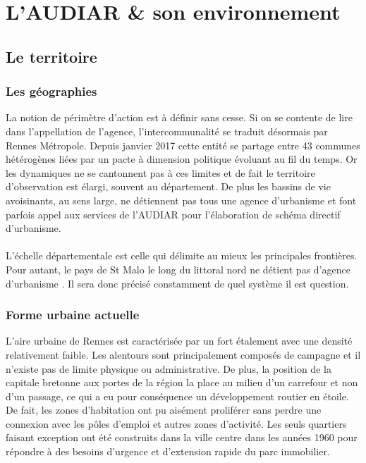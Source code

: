 \documentclass{bredele}
\begin{document}
\chapter[L'AUDIAR \& son environnement]{L'AUDIAR \& son environnement}
\section{Le territoire}
\subsection{Les géographies}
La notion de périmètre d’action est à définir sans cesse. Si on se contente de lire dans l’appellation de l’agence, l’intercommunalité se traduit désormais par Rennes Métropole. Depuis janvier 2017 cette entité se partage entre 43 communes hétérogènes liées par un pacte à dimension politique évoluant au fil du temps. Or les dynamiques ne se cantonnent pas à ces limites et de fait le territoire d'observation est élargi, souvent au département. De plus les bassins de vie avoisinants, au sens large, ne détiennent pas tous une agence d'urbanisme et font parfois appel aux services de l'AUDIAR pour l'élaboration de schéma directif d'urbanisme.
\\\\L’échelle départementale est celle qui délimite au mieux les principales frontières. Pour autant, le pays de St Malo le long du littoral nord ne détient pas d’agence d’urbanisme .
Il sera donc précisé constamment de quel système il est question.
\subsection{Forme urbaine actuelle}
L’aire urbaine de Rennes est caractérisée par un fort étalement avec une densité relativement faible. Les alentours sont principalement composés de campagne et il n’existe pas de limite physique ou administrative. De plus, la position de la capitale bretonne aux portes de la région la place au milieu d’un carrefour et non d’un passage, ce qui a eu pour conséquence un développement routier en étoile. De fait, les zones d’habitation ont pu aisément proliférer sans perdre une connexion avec les pôles d’emploi et autres zones d’activité. Les seuls quartiers faisant exception ont été construits dans la ville centre dans les années 1960 pour répondre à des besoins d'urgence et d'extension rapide du parc immobilier. 
\end{document}
